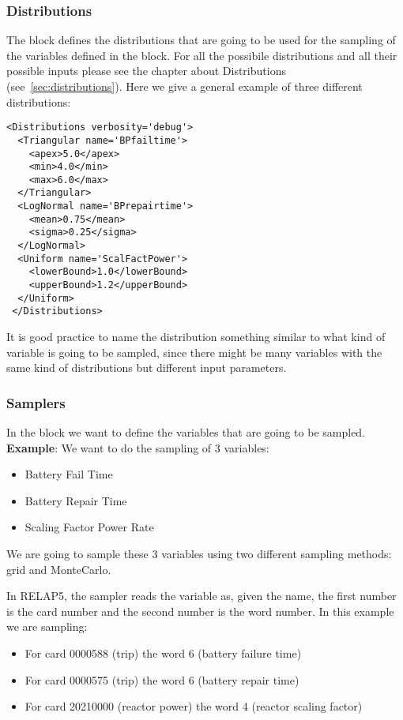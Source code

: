 \subsubsection{Distributions}
The  block defines the distributions that are going
to be used for the sampling of the variables defined in the 
block.
%
For all the possibile distributions and all their possible inputs please see the
chapter about Distributions (see~\ref{sec:distributions}).
%
Here we give a general example of three different distributions:
\begin{lstlisting}[style=XML,morekeywords={name,debug}]
<Distributions verbosity='debug'>
  <Triangular name='BPfailtime'>
    <apex>5.0</apex>
    <min>4.0</min>
    <max>6.0</max>
  </Triangular>
  <LogNormal name='BPrepairtime'>
    <mean>0.75</mean>
    <sigma>0.25</sigma>
  </LogNormal>
  <Uniform name='ScalFactPower'>
    <lowerBound>1.0</lowerBound>
    <upperBound>1.2</upperBound>
  </Uniform>
 </Distributions>
\end{lstlisting}

It is good practice to name the distribution something similar to what kind of
variable is going to be sampled, since there might be many variables with the
same kind of distributions but different input parameters.
%
\subsubsection{Samplers}
In the  block we want to define the variables that are going
to be sampled.
%
\textbf{Example}:
We want to do the sampling of 3 variables:
\begin{itemize}
  \item Battery Fail Time
  \item Battery Repair Time
  \item Scaling Factor Power Rate
\end{itemize}

We are going to sample these 3 variables using two different sampling methods:
grid and MonteCarlo.

In RELAP5, the sampler reads the variable as, given the name, the first number
is the card number and the second number is the word number.
%
In this example we are sampling:
\begin{itemize}
  \item For card 0000588 (trip) the word 6 (battery failure time)
  \item For card 0000575 (trip) the word 6 (battery repair time)
  \item For card 20210000 (reactor power) the word 4 (reactor scaling factor)
\end{itemize}

